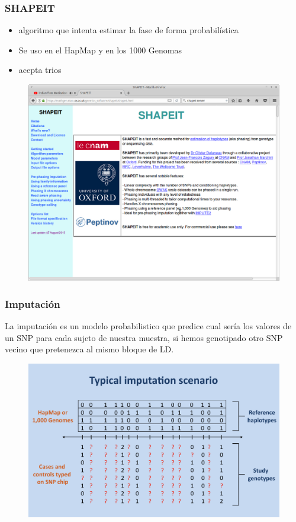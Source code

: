 \documentclass{beamer}\usepackage[]{graphicx}\usepackage[]{color}
\begin{document}
\begin{frame}
\frametitle{SHAPEIT}

\begin{itemize}
\item algoritmo que intenta estimar la fase de forma probabil\'istica
\item Se uso en el HapMap y en los 1000 Genomas 
\item acepta trios 
\end{itemize}

\begin{figure}[htbp]
\begin{center}
\includegraphics[width=.7\linewidth]{shapeit.png}
\end{center}
\end{figure}

\end{frame}

\begin{frame}
\frametitle{Imputaci\'on}
La imputaci\'on es un modelo probabilistico que predice cual ser\'ia los valores de un
SNP para cada sujeto de nuestra muestra, si hemos genotipado otro SNP vecino que
pretenezca al mismo bloque de LD.

\begin{figure}[htbp]
\begin{center}
\includegraphics[width=.7\linewidth]{scenarioA.png}
\end{center}
\end{figure}

\end{frame}
\end{document}
